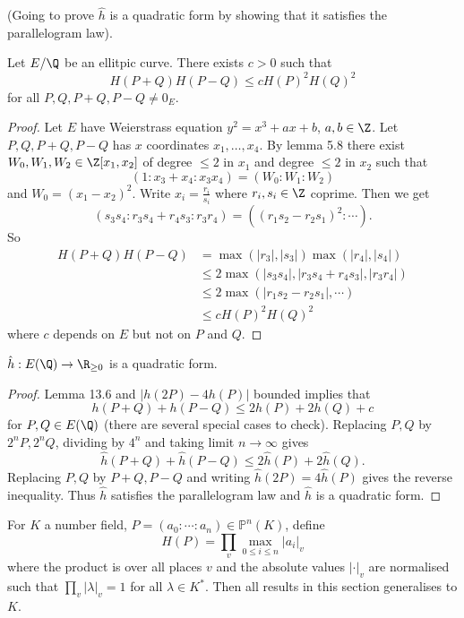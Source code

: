 \documentclass[a4paper]{article}
\theoremstyle{definition}
\theoremstyle{theorem}
\renewcommand*{\P}{\mathbb{P}}
\begin{document}
(Going to prove \(\hat h\) is a quadratic form by showing that it satisfies the parallelogram law).

\begin{lemma}
  Let \(E/\Q\) be an ellitpic curve. There exists \(c > 0\) such that
  \[
    H(P + Q) H(P - Q) \leq c H(P)^2 H(Q)^2
  \]
  for all \(P, Q, P + Q, P - Q \ne 0_E\).
\end{lemma}

\begin{proof}
  Let \(E\) have Weierstrass equation \(y^2 = x^3 + ax + b\), \(a, b \in \Z\). Let \(P, Q, P + Q, P - Q\) has \(x\) coordinates \(x_1, \dots, x_4\). By lemma 5.8 there exist \(W_0, W_1, W_2 \in \Z[x_1, x_2]\) of degree \(\leq 2\) in \(x_1\) and degree \(\leq 2\) in \(x_2\) such that
  \[
    (1: x_3 + x_4: x_3x_4) = (W_0: W_1: W_2)
  \]
  and
  \(W_0 = (x_1 - x_2)^2\). Write \(x_i = \frac{r_i}{s_i}\) where \(r_i, s_i \in \Z\) coprime. Then we get
  \[
    (s_3s_4: r_3s_4 + r_4s_3: r_3r_4) = ((r_1s_2 - r_2s_1)^2: \cdots ).
  \]
  So
  \begin{align*}
    H(P + Q) H(P - Q)
    &= \max(|r_3|, |s_3|) \max(|r_4|, |s_4|) \\
    &\leq 2 \max(|s_3s_4|, |r_3s_4 + r_4s_3|, |r_3r_4|) \\
    &\leq 2 \max(|r_1s_2 - r_2s_1|, \cdots) \\
    &\leq c H(P)^2 H(Q)^2
  \end{align*}
  where \(c\) depends on \(E\) but not on \(P\) and \(Q\).
\end{proof}

\begin{theorem}
  \(\hat h: E(\Q) \to \R_{\geq 0}\) is a quadratic form.
\end{theorem}

\begin{proof}
  Lemma 13.6 and \(|h(2P) - 4h(P)|\) bounded implies that
  \[
    h(P + Q) + h(P - Q) \leq 2 h(P) + 2h(Q) + c
  \]
  for \(P, Q \in E(\Q)\) (there are several special cases to check). Replacing \(P, Q\) by \(2^n P, 2^n Q\), dividing by \(4^n\) and taking limit \(n \to \infty\) gives
  \[
    \hat h(P + Q) + \hat h(P - Q) \leq 2 \hat h(P) + 2 \hat h(Q).
  \]
  Replacing \(P, Q\) by \(P + Q, P - Q\) and writing \(\hat h(2P) = 4 \hat h(P)\) gives the reverse inequality. Thus \(\hat h\) satisfies the parallelogram law and \(\hat h\) is a quadratic form.
\end{proof}

\begin{remark}
  For \(K\) a number field, \(P = (a_0: \cdots :a_n) \in \P^n(K)\), define
  \[
    H(P) = \prod_v \max_{0 \leq i \leq n} |a_i|_v
  \]
  where the product is over all places \(v\) and the absolute values \(|\cdot|_v\) are normalised such that \(\prod_v |\lambda|_v = 1\) for all \(\lambda \in K^*\). Then all results in this section generalises to \(K\).
\end{remark}
\end{document}
